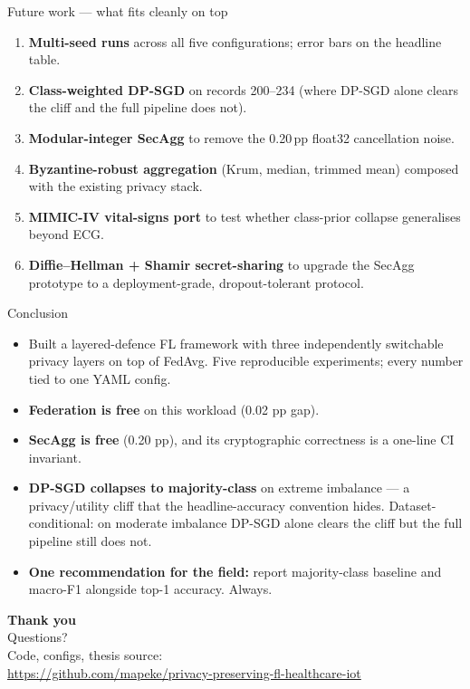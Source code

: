 \documentclass[10pt,aspectratio=169]{beamer}
\begin{document}
\begin{frame}{Future work --- what fits cleanly on top}
  \begin{enumerate}
    \item \textbf{Multi-seed runs} across all five configurations; error bars on the headline table.
    \item \textbf{Class-weighted DP-SGD} on records 200--234 (where DP-SGD alone clears the cliff and the full pipeline does not).
    \item \textbf{Modular-integer SecAgg} to remove the 0.20\,pp float32 cancellation noise.
    \item \textbf{Byzantine-robust aggregation} (Krum, median, trimmed mean) composed with the existing privacy stack.
    \item \textbf{MIMIC-IV vital-signs port} to test whether class-prior collapse generalises beyond ECG.
    \item \textbf{Diffie--Hellman + Shamir secret-sharing} to upgrade the SecAgg prototype to a deployment-grade, dropout-tolerant protocol.
  \end{enumerate}
\end{frame}

\begin{frame}{Conclusion}
  \begin{itemize}
    \item Built a layered-defence FL framework with three independently switchable privacy layers on top of FedAvg. Five reproducible experiments; every number tied to one YAML config.
    \item \textbf{Federation is free} on this workload (0.02 pp gap).
    \item \textbf{SecAgg is free} (0.20 pp), and its cryptographic correctness is a one-line CI invariant.
    \item \textbf{DP-SGD collapses to majority-class} on extreme imbalance --- a privacy/utility cliff that the headline-accuracy convention hides. Dataset-conditional: on moderate imbalance DP-SGD alone clears the cliff but the full pipeline still does not.
    \item \textbf{One recommendation for the field:} report majority-class baseline and macro-F1 alongside top-1 accuracy. Always.
  \end{itemize}
\end{frame}

\begin{frame}
  \vfill
  \begin{center}
    {\Huge \textbf{Thank you}}\\[1em]
    {\Large Questions?}\\[1.5em]
    \footnotesize
    Code, configs, thesis source:\\
    \url{https://github.com/mapeke/privacy-preserving-fl-healthcare-iot}
  \end{center}
  \vfill
\end{frame}
\end{document}
